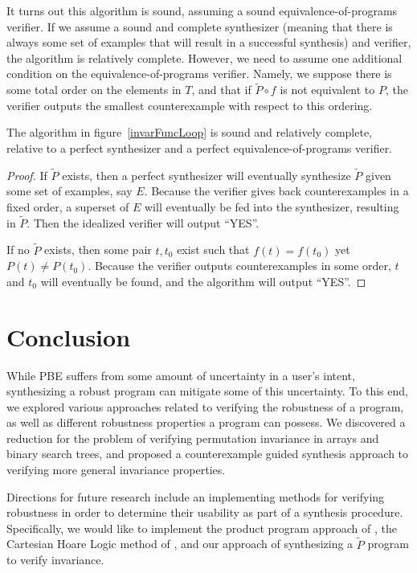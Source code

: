 \documentclass{llncs}
\begin{document}
  It turns out this algorithm is sound, assuming a sound equivalence-of-programs
  verifier.
  If we assume a sound and complete synthesizer (meaning that there is
  always some set of examples that will result in a successful synthesis)
  and verifier, the algorithm is relatively complete.
  However, we need to assume one additional condition on the
  equivalence-of-programs verifier.
  Namely, we suppose there is some total order on the elements in $T$,
  and that if $\widetilde{P}\circ f$ is not equivalent to $P$,
  the verifier outputs the smallest counterexample with respect to this
  ordering.

  \begin{theorem}
    The algorithm in figure~\ref{invarFuncLoop} is sound and relatively complete,
    relative to a perfect synthesizer and a perfect equivalence-of-programs
    verifier.
  \end{theorem}
  \begin{proof}

    If $\widetilde{P}$ exists, then a perfect synthesizer will eventually
    synthesize $\widetilde{P}$ given some set of examples, say $E$.
    Because the verifier gives back counterexamples in a fixed order,
    a superset of $E$ will eventually be fed into the synthesizer,
    resulting in $\widetilde{P}$.
    Then the idealized verifier will output ``YES''.

    If no $\widetilde{P}$ exists, then some pair $t, t_0$ exist
    such that $f(t)=f(t_0)$ yet $P(t)\ne P(t_0)$.
    Because the verifier outputs counterexamples in some order,
    $t$ and $t_0$ will eventually be found, and the algorithm will output ``YES''.
  \end{proof}

\section{Conclusion}

While PBE suffers from some amount of uncertainty in a user's intent, synthesizing
a robust program can mitigate some of this uncertainty.  To this end, we explored
various approaches related to verifying the robustness of a program, as well as
different robustness properties a program can possess.  We discovered a reduction
for the problem of verifying permutation invariance in arrays and binary search trees,
and proposed a counterexample guided synthesis approach to verifying more general
invariance properties.

Directions for future research include an implementing methods for verifying robustness
in order to determine their usability as part of a synthesis procedure.  Specifically,
we would like to implement the product program approach of \cite{bartheproduct}, the
Cartesian Hoare Logic method of \cite{sousa16}, and our approach of synthesizing a
\(\widetilde{P}\) program to verify invariance.
\end{document}
